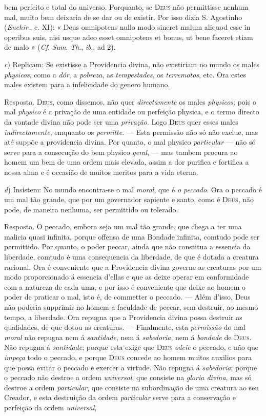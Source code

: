 bem perfeito e total do universo. Porquanto, se \textsc{Deus} não permittisse nenhum mal, muito bem deixaria de se dar ou de existir. Por isso dizia S. Agostinho (\emph{Enchir}., c. XI): « Deus omnipotens nullo modo sineret malum aliquod esse in operibus suis, nisi usque adeo esset omnipotens et bonus, ut bene faceret etiam de malo » (\emph{Cf}. \emph{Sum}. \emph{Th}., \emph{ib}., ad 2).\par \emph{c}) Replicam: Se existisse a Providencia divina, não existiriam no mundo os males \emph{physicos}, como a \emph{dór}, a \emph{pobreza}, as \emph{tempestades}, os \emph{terremotos}, etc. Ora estes males existem para a infelicidade do genero humano.\par Resposta. \textsc{Deus}, como dissemos, não quer \emph{directamente} os males \emph{physicos}; pois o mal \emph{physico} é a privação de uma entidade ou perfeição physica, e o termo directo da vontade divina não pode ser uma \emph{privação}. Logo \textsc{Deus} quer esses males \emph{indirectamente}, emquanto os \emph{permitte}. --- Esta permissão não só não exclue, mas até suppõe a providencia divina. Por quanto, o mal physico \emph{particular} --- não só serve para a consecução do bem physico \emph{geral}, --- mas tambem procura ao homem um bem de uma ordem mais elevada, assim a dor purifica e fortifica a nossa alma e é occasião de muitos meritos para a vida eterna.\par \emph{d}) Insistem: No mundo encontra-se o mal \emph{moral}, que é \emph{o peccado}. Ora o peccado é um mal tão grande, que por um governador sapiente e santo, como é \textsc{Deus}, não pode, de maneira nenhuma, ser permittido ou tolerado.\par Resposta. O peccado, embora seja um mal tão grande, que chega a ter uma malicia quasi infinita, porque offensa de uma Bondade infinita, comtudo pode ser permittido. Por quanto, o poder peccar, ainda que não constitua a essencia da liberdade, comtudo é uma consequencia da liberdade, de que é dotada a creatura racional. Ora é conveniente que a Providencia divina governe as creaturas por um modo proporcionado á essencia d'ellas e que as deixe operar em conformidade com a natureza de cada uma, e por isso é conveniente que deixe ao homem o poder de praticar o mal, isto é, de commetter o peccado. --- Além d'isso, Deus não poderia supprimir no homem a faculdade de peccar, sem destruir, ao mesmo tempo, a liberdade. Ora repugna que a Providencia divina possa destruir as qualidades, de que dotou as creaturas. --- Finalmente, esta \emph{permissão} do mal \emph{moral} não repugna nem á \emph{santidade}, nem á \emph{sabedoria}, nem á \emph{bondade} de \textsc{Deus}. Não repugna á \emph{santidade}; porque esta exige que \textsc{Deus} \emph{odeie} o peccado, e não que \emph{impeça} todo o peccado, e porque \textsc{Deus} concede ao homem muitos auxilios para que possa evitar o peccado e exercer a virtude. Não repugna á \emph{sabedoria}; porque o peccado não destroe a ordem \emph{universal}, que consiste na \emph{gloria divina}, mas só destroe a ordem \emph{particular}, que consiste na subordinação de uma creatura ao seu Creador, e esta destruição da ordem \emph{particular} serve para a conservação e perfeição da ordem \emph{universal}, 